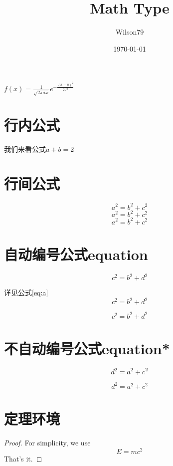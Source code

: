 \documentclass{article}
\title{Math Type}
\author{Wilson79}
\date{\today}
\begin{document}
 
    \tableofcontents %
    \maketitle %
    
    $f(x)=\frac{1}{\sqrt{2 \pi \sigma x}} e^{-\frac{(x-\mu)^{2}}{2 \sigma^{2}}}$
    
\section{行内公式} %
    我们来看公式$a+b=2$ %

\section{行间公式}
    \[a^2 = b ^2 + c^2 \] %
    $$a^2 = b ^2 + c^2$$
    \begin{displaymath}
    a^2 = b ^2 + c^2
    \end{displaymath}

\section{自动编号公式equation}
    \begin{equation} %
     c^2 = b ^2 + d^2 
    \end{equation}

    详见公式\ref{eq:a}
    \begin{equation} 
    c^2 = b ^2 + d^2 \label{eq:a}
    \end{equation}

    \begin{equation} 
     c^2 = b ^2 + d^2 \tag{*} 
    \end{equation}

\section{不自动编号公式equation*}  
    \begin{equation}
    d^2 = a ^2 + c^2 \notag
    \end{equation}
    
    \begin{equation*}
    d^2 = a ^2 + c^2 
    \end{equation*}

\section{定理环境}
    \begin{proof}
    For simplicity, we use
    \[
    E=mc^2
    \]
    That's it.
    \end{proof}
\end{document}
